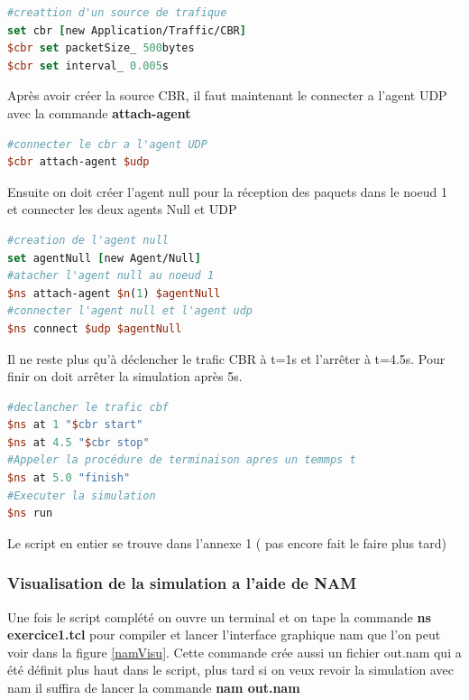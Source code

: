 \documentclass[11pt]{article}
\begin{document}
\begin{lstlisting}[language=tcl, numbers=none, framexleftmargin=0pt, 	framextopmargin=0pt, framexbottommargin=0pt]
#creattion d'un source de trafique
set cbr [new Application/Traffic/CBR]
$cbr set packetSize_ 500bytes
$cbr set interval_ 0.005s
\end{lstlisting}

\noindent
Après avoir créer la source CBR, il faut maintenant le connecter a l'agent UDP avec la commande \textbf{attach-agent}
\begin{lstlisting}[language=tcl, numbers=none, framexleftmargin=0pt, 	framextopmargin=0pt, framexbottommargin=0pt]
#connecter le cbr a l'agent UDP
$cbr attach-agent $udp
\end{lstlisting}

\noindent

Ensuite on doit créer l'agent null pour la réception des paquets dans le noeud 1 et connecter les deux agents Null et UDP
\begin{lstlisting}[language=tcl, numbers=none, framexleftmargin=0pt, 	framextopmargin=0pt, framexbottommargin=0pt]
#creation de l'agent null
set agentNull [new Agent/Null]
#atacher l'agent null au noeud 1
$ns attach-agent $n(1) $agentNull 
#connecter l'agent null et l'agent udp
$ns connect $udp $agentNull 
\end{lstlisting}

Il ne reste plus qu'à déclencher le trafic CBR à t=1s et l’arrêter à t=4.5s. Pour finir on doit arrêter la simulation après 5s. 
\begin{lstlisting}[language=tcl, numbers=none, framexleftmargin=0pt, 	framextopmargin=0pt, framexbottommargin=0pt]
#declancher le trafic cbf
$ns at 1 "$cbr start"
$ns at 4.5 "$cbr stop"
#Appeler la procédure de terminaison apres un temmps t 
$ns at 5.0 "finish"
#Executer la simulation
$ns run
\end{lstlisting}



\noindent
Le script en entier se trouve dans l'annexe 1 ( pas encore fait le faire plus tard)

\subsubsection{Visualisation de la simulation a l'aide de NAM}
Une fois le script complété on ouvre un terminal et on tape la commande \textbf{ns exercice1.tcl} pour compiler et lancer l'interface graphique nam que l'on peut voir dans la figure \ref{namVisu}. Cette commande crée aussi un fichier out.nam qui a été définit plus haut dans le script, plus tard si on veux revoir la simulation avec nam il suffira de lancer la commande \textbf{nam out.nam}
\end{document}
